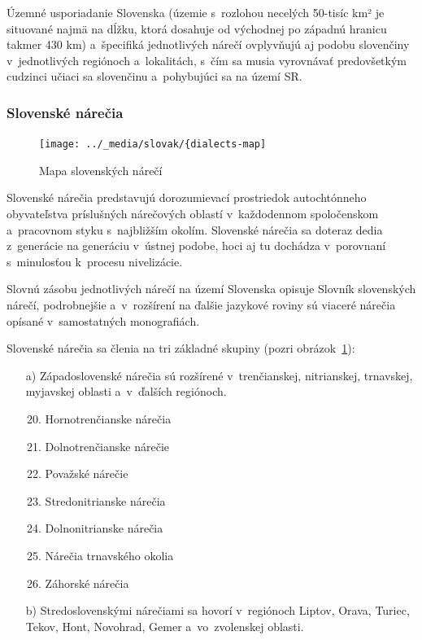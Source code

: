 \begin{multicols}{2}
Územné usporiadanie Slovenska (územie s~rozlohou necelých 50-tisíc km² je situované najmä na dĺžku, ktorá dosahuje od východnej po západnú hranicu takmer 430 km) a~špecifiká jednotlivých nárečí ovplyvňujú aj podobu slovenčiny v~jednotlivých regiónoch a~lokalitách, s~čím sa musia vyrovnávať predovšetkým cudzinci učiaci sa slovenčinu a~pohybujúci sa na území SR.

\subsubsection{Slovenské nárečia}
\begin{figure}[ht]
\centering
\texttt{[image: ../\_media/slovak/\{dialects-map]}
\caption{%
Mapa slovenských nárečí
}
\label{fig:dialects_sk}
\end{figure}

Slovenské nárečia predstavujú dorozumievací prostriedok autochtónneho obyvateľstva príslušných nárečových oblastí v~každodennom spoločenskom a~pracovnom styku s~najbližším okolím. Slovenské nárečia sa doteraz dedia z~generácie na generáciu v~ústnej podobe, hoci aj tu dochádza v~porovnaní s~minulosťou k~procesu nivelizácie.

Slovnú zásobu jednotlivých nárečí na území Slovenska opisuje Slovník slovenských nárečí, podrobnejšie a~v~rozšírení na ďalšie jazykové roviny sú viaceré nárečia opísané v~samostatných monografiách.

Slovenské nárečia sa členia na tri základné skupiny (pozri obrázok~\ref{fig:dialects_sk}):

\begin{itemize}
\item[a)] Západoslovenské nárečia sú rozšírené v~trenčianskej, nitrianskej, trnavskej, myjavskej oblasti a~v~ďalších regiónoch.

\begin{enumerate}
\setcounter{enumi}{19}
\item Hornotrenčianske nárečia
\item Dolnotrenčianske nárečie
\item Považské nárečie 
\item Stredonitrianske nárečia 
\item Dolnonitrianske nárečia 
\item Nárečia trnavského okolia
\item Záhorské nárečia 
\end{enumerate}

\item[b)] Stredoslovenskými nárečiami sa hovorí v~regiónoch Liptov, Orava, Turiec, Tekov, Hont, Novohrad, Gemer a~vo~zvolenskej oblasti.


\end{itemize}
\end{multicols}
